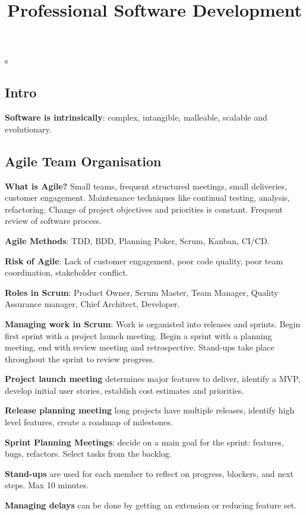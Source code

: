 \documentclass{article}
\title{Professional Software Development}
\author{}
\date{}
\begin{document}
s

\footnotesize

\subsection*{Intro}

\noindent \textbf{Software is intrinsically}: complex, intangible, malleable, scalable and evolutionary.


\subsection*{Agile Team Organisation}

\noindent \textbf{What is Agile?} Small teams, frequent structured meetings, small deliveries, customer engagement.
Maintenance techniques like continual testing, analysis, refactoring.
Change of project objectives and priorities is constant.
Frequent review of software process.

\noindent \textbf{Agile Methods}: TDD, BDD, Planning Poker, Scrum, Kanban, CI/CD.\@

\noindent \textbf{Risk of Agile}: Lack of customer engagement, poor code quality, poor team coordination, stakeholder conflict.

\noindent \textbf{Roles in Scrum}: Product Owner, Scrum Master, Team Manager, Quality Assurance manager, Chief Architect, Developer.

\noindent \textbf{Managing work in Scrum}: Work is organisted into releases and sprints.
Begin first sprint with a project launch meeting.
Begin a sprint with a planning meeting, end with review meeting and retrospective.
Stand-ups take place throughout the sprint to review progress.

\noindent \textbf{Project launch meeting} determines major features to deliver, identify a MVP, develop initial user stories,
establish cost estimates and priorities.

\noindent \textbf{Release planning meeting} long projects have multiple releases, identify high level features, create a roadmap of milestones.

\noindent \textbf{Sprint Planning Meetings}: decide on a main goal for the sprint: features, bugs, refactors. Select tasks from the backlog.

\noindent \textbf{Stand-ups} are used for each member to reflect on progress, blockers, and next steps. Max 10 minutes.

\noindent \textbf{Managing delays} can be done by getting an extension or reducing feature set.
\end{document}
